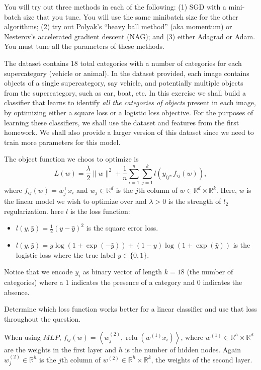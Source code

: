 \documentclass[letterpaper,11pt]{article}
\begin{document}
You will try out three methods in each of the following: (1) SGD with a
mini-batch size that you tune. You will use the same minibatch size for the
other algorithms; (2) try out Polyak’s ``heavy ball method'' (aka momentum) or
Nesterov’s accelerated gradient descent (NAG); and (3) either Adagrad or
Adam. You must tune all the parameters of these methods.

The dataset contains 18 total categories with a number of categories for each
supercategory (vehicle or animal). In the dataset provided, each image contains
objects of a single supercategory, say vehicle, and potentially multiple objects
from the supercategory, such as car, boat, etc. In this exercise we shall build
a classifier that learns to identify \emph{all the categories of objects}
present in each image, by optimizing either a square loss or a logistic loss
objective. For the purposes of learning these classifiers, we shall use the
dataset and features from the first homework. We shall also provide a larger
version of this dataset since we need to train more parameters for this model.

The object function we choos to optimize is
\begin{equation}
  L(w) = \frac{\lambda}{2}\lVert w \rVert^2 +
  \frac{1}{n}\sum_{i=1}^n\sum_{j=1}^k l\left(y_{ij},f_{ij}(w)\right),  
\end{equation}
where $f_{ij}(w) = w_j^\intercal x_i$ and $w_j \in \mathbb{R}^d$ is the $j$th
column of $w \in \mathbb{R}^d \times \mathbb{R}^k$. Here, $w$ is the linear
model we wish to optimize over and $\lambda > 0$ is the strength of $l_2$
regularization. here $l$ is the loss function:
\begin{itemize}
\item $l\left(y,\hat{y}\right) = \frac{1}{2}\left(y - \hat{y}\right)^2$ is the square error
  loss.
\item
  $l\left(y,\hat{y}\right) = y\log\left(1 + \exp\left(-\hat{y}\right)\right) +
  (1-y)\log\left(1 + \exp\left(\hat{y}\right)\right)$ is the logistic loss where
  the true label $y \in \{0,1\}$.
\end{itemize}

Notice that we encode $y_i$ as binary vector of length $k = 18$ (the number of
categories) where a $1$ indicates the presence of a category and $0$ indicates
the absence.

Determine which loss function works better for a linear classifier and use that
loss throughout the question.

When using $MLP$,
$f_{ij}(w) = \left\langle w_j^{(2)},
  \operatorname{relu}\left(w^{(1)}x_i\right)\right\rangle$, where
$w^{(1)} \in \mathbb{R}^h \times \mathbb{R}^d$ are the weights in the first
layer and $h$ is the number of hidden nodes. Again $w_j^{(2)} \in \mathbb{R}^h$
is the $j$th column of $w^{(2)} \in \mathbb{R}^h \times \mathbb{R}^k$, the
weights of the second layer.
\end{document}
